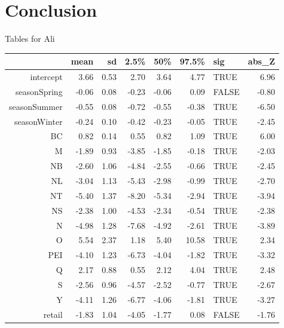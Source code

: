 \documentclass[12pt]{article}
\begin{document}
\newpage
\section{Conclusion}


Tables for Ali
\begin{table}[ht]
    \centering
    \begin{tabular}{rrrrrrlr}
      \hline
     & mean & sd & 2.5\% & 50\% & 97.5\% & sig & abs\_Z \\ 
      \hline
    intercept & 3.66 & 0.53 & 2.70 & 3.64 & 4.77 & TRUE & 6.96 \\ 
      seasonSpring & -0.06 & 0.08 & -0.23 & -0.06 & 0.09 & FALSE & -0.80 \\ 
      seasonSummer & -0.55 & 0.08 & -0.72 & -0.55 & -0.38 & TRUE & -6.50 \\ 
      seasonWinter & -0.24 & 0.10 & -0.42 & -0.23 & -0.05 & TRUE & -2.45 \\ 
      BC & 0.82 & 0.14 & 0.55 & 0.82 & 1.09 & TRUE & 6.00 \\ 
      M & -1.89 & 0.93 & -3.85 & -1.85 & -0.18 & TRUE & -2.03 \\ 
      NB & -2.60 & 1.06 & -4.84 & -2.55 & -0.66 & TRUE & -2.45 \\ 
      NL & -3.04 & 1.13 & -5.43 & -2.98 & -0.99 & TRUE & -2.70 \\ 
      NT & -5.40 & 1.37 & -8.20 & -5.34 & -2.94 & TRUE & -3.94 \\ 
      NS & -2.38 & 1.00 & -4.53 & -2.34 & -0.54 & TRUE & -2.38 \\ 
      N & -4.98 & 1.28 & -7.68 & -4.92 & -2.61 & TRUE & -3.89 \\ 
      O & 5.54 & 2.37 & 1.18 & 5.40 & 10.58 & TRUE & 2.34 \\ 
      PEI & -4.10 & 1.23 & -6.73 & -4.04 & -1.82 & TRUE & -3.32 \\ 
      Q & 2.17 & 0.88 & 0.55 & 2.12 & 4.04 & TRUE & 2.48 \\ 
      S & -2.56 & 0.96 & -4.57 & -2.52 & -0.77 & TRUE & -2.67 \\ 
      Y & -4.11 & 1.26 & -6.77 & -4.06 & -1.81 & TRUE & -3.27 \\ 
      retail & -1.83 & 1.04 & -4.05 & -1.77 & 0.08 & FALSE & -1.76 \\ 
       \hline
    \end{tabular}
    \end{table}
\end{document}
